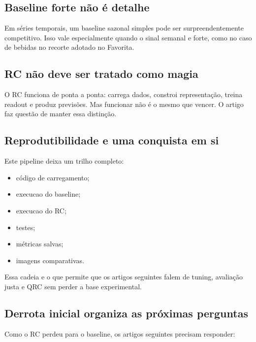 \documentclass[12pt]{article}
\providecommand{\tightlist}{%
              \setlength{\itemsep}{0pt}\setlength{\parskip}{0pt}}
\begin{document}
\subsection{Baseline forte não é detalhe}\label{81-baseline-forte-nuxe3o-uxe9-detalhe}

Em séries temporais, um baseline sazonal simples pode ser surpreendentemente competitivo. Isso vale especialmente quando o sinal semanal e forte, como no caso de bebidas no recorte adotado no Favorita.

\subsection{RC não deve ser tratado como magia}\label{82-rc-nuxe3o-deve-ser-tratado-como-magia}

O RC funciona de ponta a ponta: carrega dados, constroi representação, treina readout e produz previsões. Mas funcionar não é o mesmo que vencer. O artigo faz questão de manter essa distinção.

\subsection{Reprodutibilidade e uma conquista em si}\label{83-reprodutibilidade-e-uma-conquista-em-si}

Este pipeline deixa um trilho completo:

\begin{itemize}
\tightlist
\item
  código de carregamento;
\item
  execucao do baseline;
\item
  execucao do RC;
\item
  testes;
\item
  métricas salvas;
\item
  imagens comparativas.
\end{itemize}

Essa cadeia e o que permite que os artigos seguintes falem de tuning, avaliação justa e QRC sem perder a base experimental.

\subsection{Derrota inicial organiza as próximas perguntas}\label{84-derrota-inicial-organiza-as-pruxf3ximas-perguntas}

Como o RC perdeu para o baseline, os artigos seguintes precisam responder:
\end{document}
